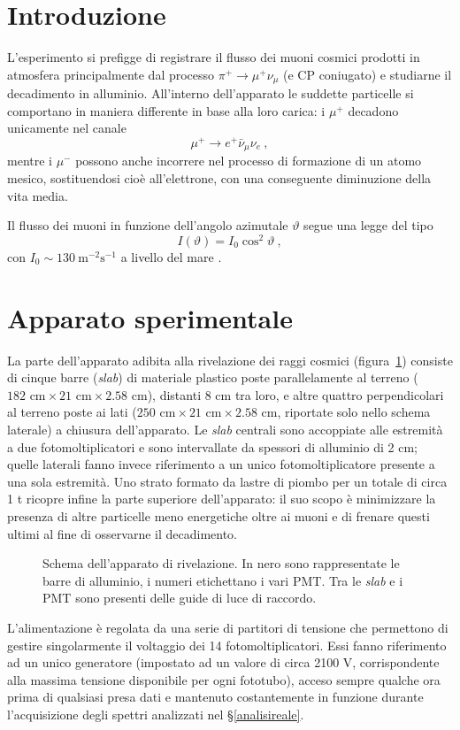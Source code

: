 \documentclass[10pt, oneside, a4paper]{article}   	%
\renewcommand{\theta}{\vartheta}			%
\begin{document}
\section{Introduzione}
L'esperimento si prefigge di registrare il flusso dei muoni cosmici prodotti in atmosfera principalmente dal processo $\pi^+\to\mu^+\nu_\mu$ (e CP coniugato) e studiarne il decadimento in alluminio. All'interno dell'apparato le suddette particelle si comportano in maniera differente in base alla loro carica: i $\mu^+$ decadono unicamente nel canale
\[\mu^+\to e^+\bar{\nu}_\mu\nu_e\ ,\]
mentre i $\mu^-$ possono anche incorrere nel processo di formazione di un atomo mesico, sostituendosi cioè all'elettrone, con una conseguente diminuzione della vita media.

Il flusso dei muoni in funzione dell'angolo azimutale $\theta$ segue una legge del tipo 
\[I(\theta)=I_0\cos^2\theta\ ,\]
con $I_0\sim130\ \text{m}^{-2}\text{s}^{-1}$ a livello del mare \cite{pdg2}.
%
\section{Apparato sperimentale}
La parte dell'apparato adibita alla rivelazione dei raggi cosmici (figura~\ref{appScheme}) consiste di cinque barre (\emph{slab}) di materiale plastico poste parallelamente al terreno ($182 \text{ cm}\times21\text{ cm}\times2.58$ cm), distanti 8 cm tra loro, e altre quattro perpendicolari al terreno poste ai lati ($250\text{ cm}\times21\text{ cm}\times2.58$ cm, riportate solo nello schema laterale) a chiusura dell'apparato. Le \emph{slab} centrali sono accoppiate alle estremità a due fotomoltiplicatori e sono intervallate da spessori di alluminio di 2 cm; quelle laterali fanno invece riferimento a un unico fotomoltiplicatore presente a una sola estremità. Uno strato formato da lastre di piombo per un totale di circa 1 t ricopre infine la parte superiore dell'apparato: il suo scopo è minimizzare la presenza di altre particelle meno energetiche oltre ai muoni e di frenare questi ultimi al fine di osservarne il decadimento.
%
\begin{figure}[H]
	\centering
		
	\caption{Schema dell'apparato di rivelazione. In nero sono rappresentate le barre di alluminio, i numeri etichettano i vari PMT. Tra le \emph{slab} e i PMT sono presenti delle guide di luce di raccordo.}
	\label{appScheme}
\end{figure}
%
L'alimentazione è regolata da una serie di partitori di tensione che permettono di gestire singolarmente il voltaggio dei 14 fotomoltiplicatori. Essi fanno riferimento ad un unico generatore (impostato ad un valore di circa 2100 V, corrispondente alla massima tensione disponibile per ogni fototubo), acceso sempre qualche ora prima di qualsiasi presa dati e mantenuto costantemente in funzione durante l'acquisizione degli spettri analizzati nel \S\ref{analisireale}.
\end{document}
